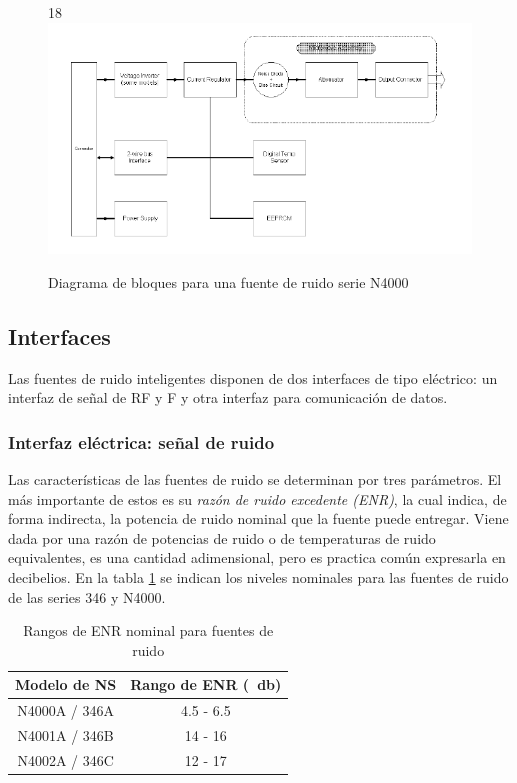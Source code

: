 	
	\begin{figure}[h!]{18}
		\centering
		\includegraphics{Imagenes/DiagramaBloquesFuenteRuido.pdf}
		\caption{Diagrama de bloques para una fuente de ruido serie N4000}
		\label{Fig:DiagramaBloquesFuenteRuido}
	\end{figure}
	

	\subsection{Interfaces}
	Las fuentes de ruido inteligentes disponen de dos interfaces de tipo eléctrico: un interfaz de señal de RF y {\textmu}F y otra interfaz para comunicación de datos. 
	
	\subsubsection{Interfaz eléctrica: señal de ruido}
	Las características de las fuentes de ruido se determinan por tres parámetros. El más importante de estos es su \emph{razón de ruido excedente (ENR)}, la cual indica, de forma indirecta, la potencia de ruido nominal que la fuente puede entregar. Viene dada por una razón de potencias de ruido o de temperaturas de ruido equivalentes, es una cantidad adimensional, pero es practica común expresarla en decibelios. En la tabla \ref{Tab:RangosNominalesENR} se indican los niveles nominales para las fuentes de ruido de las series 346 y N4000.
	
	\begin{table}[h!]
		\centering
		\begin{tabular}{cc}
			\toprule
			Modelo de NS	&	Rango de ENR (\SI{}{\decibel})		\\
			\midrule	
			N4000A / 346A	&	4.5 - 6.5 					\\
			\midrule				
			N4001A / 346B	&	14 - 16  					\\
			\midrule	
			N4002A / 346C	& 	12 - 17 					\\
			\bottomrule			
		\end{tabular}
		\caption{Rangos de ENR nominal para fuentes de ruido}
		\label{Tab:RangosNominalesENR}
	\end{table}

